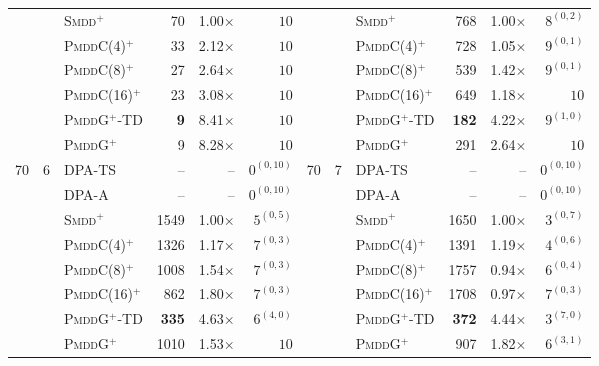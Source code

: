 \documentclass[letterpaper]{article}
\begin{document}
\begin{table}[t]
{\begin{tabular}{rrlrrrrrlrrr}
 &  & \textsc{Smdd}$^+$ & 70 & 1.00$\times$ & $10$ &  &  & \textsc{Smdd}$^+$ & 768 & 1.00$\times$ & $8^{(0, 2)}$ \\
 &  & \textsc{PmddC}(4)$^+$ & 33 & 2.12$\times$ & $10$ &  &  & \textsc{PmddC}(4)$^+$ & 728 & 1.05$\times$ & $9^{(0, 1)}$ \\
 &  & \textsc{PmddC}(8)$^+$ & 27 & 2.64$\times$ & $10$ &  &  & \textsc{PmddC}(8)$^+$ & 539 & 1.42$\times$ & $9^{(0, 1)}$ \\
 &  & \textsc{PmddC}(16)$^+$ & 23 & 3.08$\times$ & $10$ &  &  & \textsc{PmddC}(16)$^+$ & 649 & 1.18$\times$ & $10$ \\
 &  & \textsc{PmddG$^+$-TD} & \textbf{9} & 8.41$\times$ & $10$ &  &  & \textsc{PmddG$^+$-TD} & \textbf{182} & 4.22$\times$ & $9^{(1, 0)}$ \\
 &  & \textsc{PmddG}$^+$ & 9 & 8.28$\times$ & $10$ &  &  & \textsc{PmddG}$^+$ & 291 & 2.64$\times$ & $10$ \\
\midrule
\multirow{8}{*}{70} & \multirow{8}{*}{6} & DPA-TS & -- & -- & $0^{(0, 10)}$ & \multirow{8}{*}{70} & \multirow{8}{*}{7} & DPA-TS & -- & -- & $0^{(0, 10)}$ \\
 &  & DPA-A & -- & -- & $0^{(0, 10)}$ &  &  & DPA-A & -- & -- & $0^{(0, 10)}$ \\
 &  & \textsc{Smdd}$^+$ & 1549 & 1.00$\times$ & $5^{(0, 5)}$ &  &  & \textsc{Smdd}$^+$ & 1650 & 1.00$\times$ & $3^{(0, 7)}$ \\
 &  & \textsc{PmddC}(4)$^+$ & 1326 & 1.17$\times$ & $7^{(0, 3)}$ &  &  & \textsc{PmddC}(4)$^+$ & 1391 & 1.19$\times$ & $4^{(0, 6)}$ \\
 &  & \textsc{PmddC}(8)$^+$ & 1008 & 1.54$\times$ & $7^{(0, 3)}$ &  &  & \textsc{PmddC}(8)$^+$ & 1757 & 0.94$\times$ & $6^{(0, 4)}$ \\
 &  & \textsc{PmddC}(16)$^+$ & 862 & 1.80$\times$ & $7^{(0, 3)}$ &  &  & \textsc{PmddC}(16)$^+$ & 1708 & 0.97$\times$ & $7^{(0, 3)}$ \\
 &  & \textsc{PmddG$^+$-TD} & \textbf{335} & 4.63$\times$ & $6^{(4, 0)}$ &  &  & \textsc{PmddG$^+$-TD} & \textbf{372} & 4.44$\times$ & $3^{(7, 0)}$ \\
 &  & \textsc{PmddG}$^+$ & 1010 & 1.53$\times$ & $10$ &  &  & \textsc{PmddG}$^+$ & 907 & 1.82$\times$ & $6^{(3, 1)}$ \\
\bottomrule
\end{tabular}
}
\label{tab:mokp_result}
\end{table}
\end{document}
